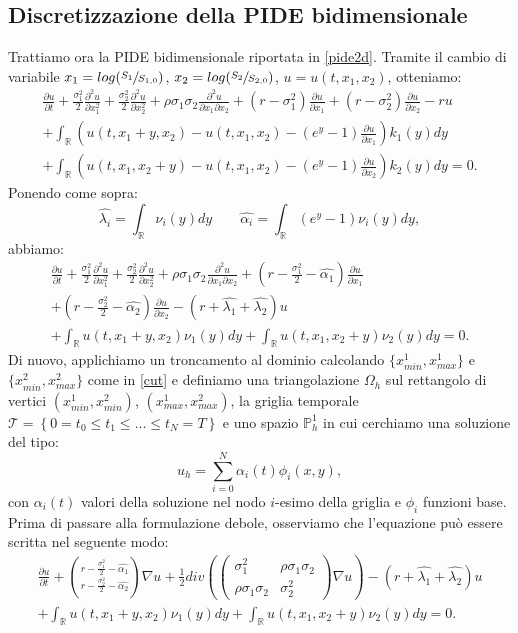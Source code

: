 \documentclass[a4paper,10pt]{report}
\newcommand{\der}[2]{\frac{\partial #1}{\partial #2}}
\newcommand{\dder}[2]{\frac{\partial^2 #1}{\partial #2^2}}
\newcommand{\dmix}[3]{\frac{\partial^2 #1}{\partial #2 \partial #3}}
\theoremstyle{plain}
\theoremstyle{definition}
\theoremstyle{remark}
\begin{document}
\subsection{Discretizzazione della PIDE bidimensionale}
Trattiamo ora la PIDE bidimensionale riportata in \ref{pide2d}. Tramite il cambio di variabile $x_1=log(\sfrac{S_1}{S_{1,0}})$, $x_2=log(\sfrac{S_2}{S_{2,0}})$, $u=u(t, x_1, x_2)$, otteniamo:
\begin{multline}
\der{u}{t}+\frac{\sigma_1^2}{2}\dder{u}{x_1}+\frac{\sigma_2^2}{2}\dder{u}{x_2}+\rho\sigma_1\sigma_2\dmix{u}{x_1}{x_2}+
\left(r-\sigma_1^2\right)\der{u}{x_1}+
\left(r-\sigma_2^2\right)\der{u}{x_2}-ru\\
+\int_\mathbb{R}\left( u(t,x_1+y,x_2)-u(t,x_1,x_2)-(e^y-1)\der{u}{x_1}\right)k_1(y)dy\\
+\int_\mathbb{R}\left( u(t,x_1,x_2+y)-u(t,x_1,x_2)-(e^y-1)\der{u}{x_2}\right)k_2(y)dy=0.
\label{pide2dcostcoeff}
\end{multline}
Ponendo come sopra:$$\hat{\lambda_i}=\int_\mathbb{R}\nu_i(y)dy \qquad \hat{\alpha_i}=\int_\mathbb{R}(e^y-1)\nu_i(y)dy,$$abbiamo:
\begin{multline}
\der{u}{t}+\frac{\sigma_1^2}{2}\dder{u}{x_1}+\frac{\sigma_2^2}{2}\dder{u}{x_2}+\rho\sigma_1\sigma_2\dmix{u}{x_1}{x_2}+
\left(r-\frac{\sigma_1^2}{2}-\hat{\alpha_1}\right)\der{u}{x_1}\\+
\left(r-\frac{\sigma_2^2}{2}-\hat{\alpha_2}\right)\der{u}{x_2}-(r+\hat{\lambda_1}+\hat{\lambda_2})u\\+
\int_\mathbb{R}u(t,x_1+y,x_2)\nu_1(y)dy+
\int_\mathbb{R}u(t,x_1,x_2+y)\nu_2(y)dy=0.
\label{pide2dcostcoeff2}
\end{multline}
Di nuovo, applichiamo un troncamento al dominio calcolando $\{x_{min}^1, x_{max}^1\}$ e $\{x_{min}^2, x_{max}^2\}$ come in \ref{cut} e definiamo una triangolazione $\Omega_h$ sul rettangolo di vertici $(x_{min}^1, x_{min}^2)$, $(x_{max}^1, x_{max}^2)$, la griglia temporale $\mathcal{T}=\left\{0= t_0\leq t_1\leq ... \leq t_N=T\right\}$ e uno spazio $\mathbb{P}_h^1$ in cui cerchiamo una soluzione del tipo: $$u_h=\sum_{i=0}^{N}\alpha_i(t) \phi_i(x,y),$$con $\alpha_i(t)$ valori della soluzione nel nodo $i$-esimo della griglia e $\phi_i$ funzioni base.
Prima di passare alla formulazione debole, osserviamo che l'equazione pu\`o essere scritta nel seguente modo:
\begin{multline}
\der{u}{t}+\binom{r-\frac{\sigma_1^2}{2}-\hat{\alpha_1}}{r-\frac{\sigma_2^2}{2}-\hat{\alpha_2}}\nabla u+\frac{1}{2}div\left(\left(\begin{matrix}\sigma_1^2 & \rho\sigma_1\sigma_2\\ \rho\sigma_1\sigma_2 & \sigma_2^2 \end{matrix}\right)\nabla u\right)-(r+\hat{\lambda_1}+\hat{\lambda_2})u\\
+\int_\mathbb{R}u(t,x_1+y,x_2)\nu_1(y)dy+
\int_\mathbb{R}u(t,x_1,x_2+y)\nu_2(y)dy=0.
\end{multline}
\end{document}
